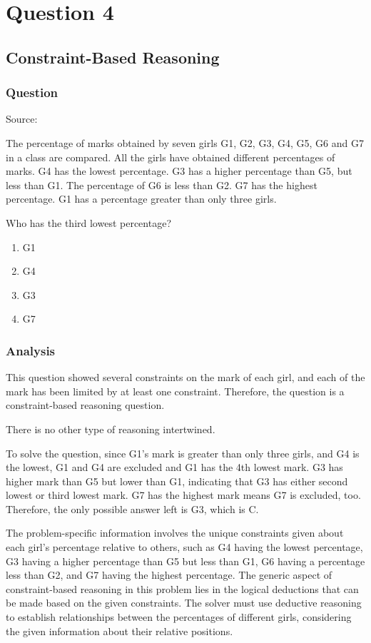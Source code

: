 \documentclass[12pt, a4paper]{article}
\begin{document}
\newpage
\section*{Question 4}
\subsection*{Constraint-Based Reasoning}
\subsubsection*{Question}
Source: \cite{Bhatia_2023a}

The percentage of marks obtained by seven girls G1, G2, G3, G4, G5, G6 and G7 in a class are compared. All the girls have obtained different percentages of marks. G4 has the lowest percentage. G3 has a higher percentage than G5, but less than G1. The percentage of G6 is less than G2. G7 has the highest percentage. G1 has a percentage greater than only three girls.

Who has the third lowest percentage?

\begin{enumerate}[label=(\Alph*)]
    \item G1
    \item G4
    \item G3
    \item G7
\end{enumerate}

\subsubsection*{Analysis}
This question showed several constraints on the mark of each girl, and each of the mark has been limited by at least one constraint. Therefore, the question is a constraint-based reasoning question.

There is no other type of reasoning intertwined.

To solve the question, since G1's mark is greater than only three girls, and G4 is the lowest, G1 and G4 are excluded and G1 has the 4th lowest mark. G3 has higher mark than G5 but lower than G1, indicating that G3 has either second lowest or third lowest mark. G7 has the highest mark means G7 is excluded, too. Therefore, the only possible answer left is G3, which is C.

The problem-specific information involves the unique constraints given about each girl's percentage relative to others, such as G4 having the lowest percentage, G3 having a higher percentage than G5 but less than G1, G6 having a percentage less than G2, and G7 having the highest percentage. The generic aspect of constraint-based reasoning in this problem lies in the logical deductions that can be made based on the given constraints. The solver must use deductive reasoning to establish relationships between the percentages of different girls, considering the given information about their relative positions.
\end{document}

